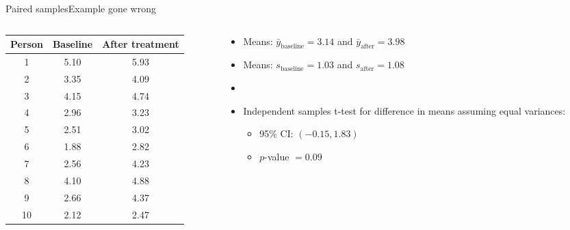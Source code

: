 \documentclass[xcolor=dvipsnames]{beamer}
\begin{document}
\begin{frame}{Paired samples}{Example gone wrong}
	\begin{columns}
		\begin{column}{.5 \textwidth}
					{\scriptsize
	\begin{tabular}{|c|c|c|}
		\hline
		\textbf{Person} & \textbf{Baseline} &  \textbf{After treatment} \\ \hline \hline
		1  &    5.10 &   5.93  \\ \hline 
		2  &    3.35 &   4.09 \\ \hline 
		3  &   4.15  &  4.74  \\ \hline 
		4  &   2.96  &  3.23  \\ \hline 
		5  &    2.51 &   3.02 \\ \hline 
		6  &   1.88  &  2.82  \\ \hline 
		7  &   2.56  &  4.23 \\ \hline 
		8  &    4.10 &   4.88 \\ \hline 
		9  &   2.66  &  4.37  \\ \hline 
		10  &    2.12  &  2.47 \\ \hline 
	\end{tabular}
}
		\end{column}
	\begin{column}{.5 \textwidth}
		\begin{itemize}
			\item Means: $\bar{y}_{\text{baseline}} = 3.14$ and $\bar{y}_{\text{after}} = 3.98$
			\item Means: $s_{\text{baseline}} = 1.03$ and $s_{\text{after}} = 1.08$
			\item[]
			\item Independent samples t-test for difference in means assuming equal variances:
			\begin{itemize}
				\item 95\% CI: $(-0.15,  1.83)$
				\item $p$-value $=0.09$
			\end{itemize}
		\end{itemize}
	\end{column}
	\end{columns}
\end{frame}
\end{document}
